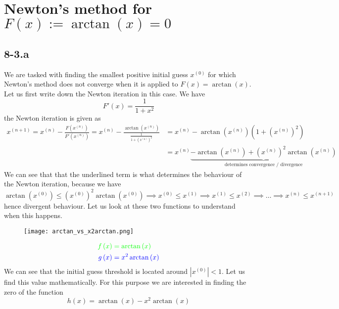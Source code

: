 \documentclass{article}
\newcommand\xk{x^{\left(n\right)}}
\newcommand\xkn{x^{\left(n+1\right)}}
\newcommand\xz{x^{\left(0\right)}}
\begin{document}
\section*{Newton's method for $F\left(x\right) := \arctan\left(x\right) = 0$}
\subsection*{8-3.a}
We are tasked with finding the smallest positive initial guess $\xz$ for which Newton's method does not converge when it is applied to $F\left(x\right) = \arctan\left(x\right)$. Let us first write down the Newton iteration in this case. We have
\begin{equation*}
    F'\left(x\right) = \frac{1}{1 + x^{2}}
\end{equation*}
the Newton iteration is given as
\begin{align*}
    \xkn = \xk - \frac{F\left(\xk\right)}{F'\left(\xk\right)} = \xk - \frac{\arctan\left(\xk\right)}{\frac{1}{1 + \left(\xk\right)^{2}}} &= \xk - \arctan\left(\xk\right)\left(1+ \left(\xk\right)^{2}\right) \\
    &= \xk \underbrace{- \arctan\left(\xk\right) + \left(\xk\right)^{2}\arctan\left(\xk\right)}_{\text{determines convergence / divergence}}
\end{align*}
We can see that that the underlined term is what determines the behaviour of the Newton iteration, because we have
\begin{equation*}
    \arctan\left(\xz\right) \leq \left(\xz\right)^{2}\arctan\left(\xz\right) \implies \xz \leq x^{\left(1\right)} \implies x^{\left(1\right)} \leq x^{\left(2\right)} \implies \dots \implies \xk \leq \xkn
\end{equation*}
hence divergent behaviour. Let us look at these two functions to understand when this happens.
\begin{figure}[!hbt]
    \centering
\texttt{[image: arctan\_vs\_x2arctan.png]}
\end{figure}
\begin{align*}
    \color{green} f\left(x\right) &\color{green}= \arctan\left(x\right) \\
    \color{blue}g\left(x\right) &\color{blue}= x^{2}\arctan\left(x\right)
\end{align*}
We can see that the initial guess threshold is located around $\left\lvert \xz \right\rvert < 1$. Let us find this value mathematically. For this purpose we are interested in finding the zero of the function
\begin{equation*}
    h\left(x\right)= \arctan\left(x\right) - x^{2}\arctan\left(x\right)
\end{equation*}
\end{document}
